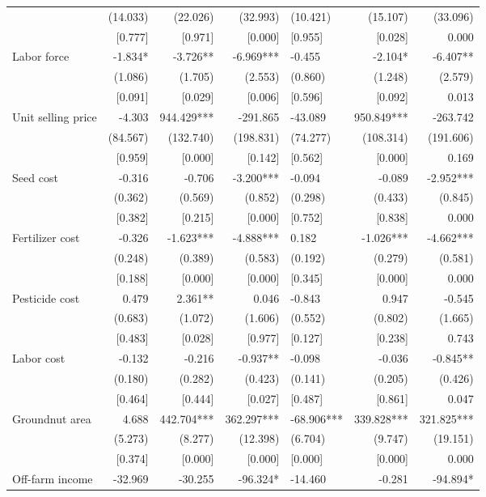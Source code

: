 \documentclass[
]{article}
\begin{document}
\begin{landscape}
\begin{ThreePartTable}
\begin{longtable}[t]{lrrrlrr}
 & (14.033) & (22.026) & (32.993) & (10.421) & (15.107) & (33.096)\\
 & {}[0.777] & {}[0.971] & {}[0.000] & {}[0.955] & {}[0.028] & 0.000\\
Labor force & -1.834* & -3.726** & -6.969*** & -0.455 & -2.104* & -6.407**\\
 & (1.086) & (1.705) & (2.553) & (0.860) & (1.248) & (2.579)\\
 & {}[0.091] & {}[0.029] & {}[0.006] & {}[0.596] & {}[0.092] & 0.013\\
Unit selling price & -4.303 & 944.429*** & -291.865 & -43.089 & 950.849*** & -263.742\\
 & (84.567) & (132.740) & (198.831) & (74.277) & (108.314) & (191.606)\\
 & {}[0.959] & {}[0.000] & {}[0.142] & {}[0.562] & {}[0.000] & 0.169\\
Seed cost & -0.316 & -0.706 & -3.200*** & -0.094 & -0.089 & -2.952***\\
 & (0.362) & (0.569) & (0.852) & (0.298) & (0.433) & (0.845)\\
 & {}[0.382] & {}[0.215] & {}[0.000] & {}[0.752] & {}[0.838] & 0.000\\
Fertilizer cost & -0.326 & -1.623*** & -4.888*** & 0.182 & -1.026*** & -4.662***\\
 & (0.248) & (0.389) & (0.583) & (0.192) & (0.279) & (0.581)\\
 & {}[0.188] & {}[0.000] & {}[0.000] & {}[0.345] & {}[0.000] & 0.000\\
Pesticide cost & 0.479 & 2.361** & 0.046 & -0.843 & 0.947 & -0.545\\
 & (0.683) & (1.072) & (1.606) & (0.552) & (0.802) & (1.665)\\
 & {}[0.483] & {}[0.028] & {}[0.977] & {}[0.127] & {}[0.238] & 0.743\\
Labor cost & -0.132 & -0.216 & -0.937** & -0.098 & -0.036 & -0.845**\\
 & (0.180) & (0.282) & (0.423) & (0.141) & (0.205) & (0.426)\\
 & {}[0.464] & {}[0.444] & {}[0.027] & {}[0.487] & {}[0.861] & 0.047\\
Groundnut area & 4.688 & 442.704*** & 362.297*** & -68.906*** & 339.828*** & 321.825***\\
 & (5.273) & (8.277) & (12.398) & (6.704) & (9.747) & (19.151)\\
 & {}[0.374] & {}[0.000] & {}[0.000] & {}[0.000] & {}[0.000] & 0.000\\
Off-farm income & -32.969 & -30.255 & -96.324* & -14.460 & -0.281 & -94.894*\\

\end{longtable}
\end{ThreePartTable}
\end{landscape}
\end{document}
